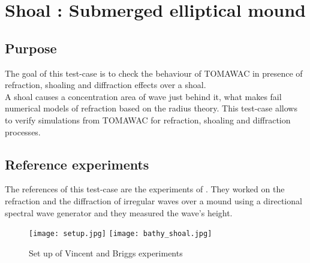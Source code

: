 \section{Shoal : Submerged elliptical mound}
%

%
\subsection{Purpose}
The goal of this test-case is to check the behaviour of TOMAWAC in presence of refraction, shoaling and diffraction effects over a shoal.\\
A shoal causes a concentration area of wave just behind it, what makes fail numerical models of refraction based on the radius theory. This test-case allows to verify simulations from TOMAWAC for refraction, shoaling and diffraction processes.

\subsection{Reference experiments}
The references of this test-case are the experiments of \cite{Vincent1989}. They worked on the refraction and the diffraction of irregular waves over a mound using a directional spectral wave generator and they measured the wave's height.\\

\begin{figure}[h!]
\label{shoalsetup}
  \centering
    \texttt{[image: setup.jpg]}
      \texttt{[image: bathy\_shoal.jpg]}
      \caption{Set up of Vincent and Briggs experiments}
\end{figure}

